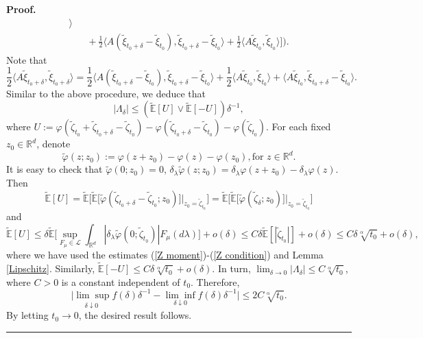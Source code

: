 \documentclass[a4paper,oneside,10pt]{article}%
\newenvironment{proof}[1][Proof]{\noindent \textbf{#1.} }{\  \rule{0.5em}{0.5em}}
\numberwithin{equation}{section}
\begin{document}
\begin{proof}
\begin{align*}
\rangle \\
&  \text{ \  \ }+\frac{1}{2}\langle A(\tilde{\xi}_{t_{0}+\delta}-\tilde{\xi}
_{t_{0}}),\tilde{\xi}_{t_{0}+\delta}-\tilde{\xi}_{t_{0}}\rangle+\frac{1}{2}
\langle A\tilde{\xi}_{t_{0}},\tilde{\xi}_{t_{0}}\rangle \big]\Big).
\end{align*}
Note that
\[
\frac{1}{2}\langle A\tilde{\xi}_{t_{0}+\delta},\tilde{\xi}_{t_{0}+\delta
}\rangle=\frac{1}{2}\langle A(\tilde{\xi}_{t_{0}+\delta}-\tilde{\xi} _{t_{0}%
}),\tilde{\xi}_{t_{0}+\delta}-\tilde{\xi}_{t_{0}}\rangle+\frac{1}{2} \langle
A\tilde{\xi}_{t_{0}},\tilde{\xi}_{t_{0}}\rangle+\langle A\tilde{\xi}_{t_{0}},
\tilde{\xi}_{t_{0}+\delta}-\tilde{\xi}_{t_{0}}\rangle.
\]
Similar to the above procedure, we deduce that
\[
|\Lambda_{\delta}|\leq(\mathbb{\tilde{E}}[U]\vee \mathbb{\tilde{E}}
[-U])\delta^{-1},
\]
where $U:=\varphi(\tilde{\zeta}_{t_{0}}+\tilde{\zeta}_{t_{0}+\delta}-\tilde{
\zeta}_{t_{0}})-\varphi(\tilde{\zeta}_{t_{0}+\delta}-\tilde{\zeta} _{t_{0}%
})-\varphi(\tilde{\zeta}_{t_{0}})$. For each fixed $z_{0}\in \mathbb{R}^{d}$,
denote
\[
\tilde{\varphi}(z;z_{0}):=\varphi(z+z_{0})-\varphi(z)-\varphi(z_{0}),\text{
for }z\in \mathbb{R}^{d}.
\]
It is easy to check that $\tilde{\varphi}(0;z_{0})=0$, $\delta_{\lambda}
\tilde{\varphi}(z;z_{0})=\delta_{\lambda}\varphi(z+z_{0})-\delta_{\lambda
}\varphi(z)$. Then
\[
\mathbb{\tilde{E}}[U]=\mathbb{\tilde{E}}\Big[\mathbb{\tilde{E}} \big[\tilde
{\varphi}( \tilde{\zeta}_{t_{0}+\delta}-\tilde{\zeta} _{t_{0}};z_{0}%
)\big]\big|_{z_{0}=\tilde{\zeta}_{t_{0}}}\Big] =\mathbb{\tilde{E}%
}\Big[\mathbb{\tilde{E}} \big[\tilde{\varphi}( \tilde{\zeta}_{\delta}%
;z_{0})\big]\big|_{z_{0}=\tilde{\zeta}_{t_{0}}}\Big]
\]
and
\[
\mathbb{\tilde{E}}[U]\leq \delta \mathbb{\tilde{E}}\Big[\sup \limits_{F_{\mu}%
\in \mathcal{L}}\int_{\mathbb{R}^{d}}|\delta_{\lambda}\tilde{\varphi}(0;\tilde{
\zeta}_{t_{0}})|F_{\mu}(d\lambda)\Big]+o(\delta)\leq C\delta \mathbb{\tilde{E}}
[|\tilde{\zeta}_{t_{0}}|]+o(\delta)\leq C\delta \sqrt[\alpha]{t_{0}}
+o(\delta),
\]
where we have used the estimates (\ref{Z moment})-(\ref{Z condition}) and
Lemma \ref{Lipschitz}. Similarly, $\mathbb{\tilde{E}}[-U]\leq C\delta
\sqrt[\alpha]{t_{0}}+o(\delta)$. In turn, $\lim_{\delta \rightarrow0}%
|\Lambda_{\delta}|\leq C\sqrt[\alpha]{t_{0}}$, where $C>0$ is a constant
independent of $t_{0}$. Therefore,
\[
\underset{\delta \downarrow0}{|\lim \sup}f(\delta)\delta^{-1}-\underset{
\delta \downarrow0}{\lim \inf}f(\delta)\delta^{-1}|\leq2C\sqrt[\alpha]{t_{0}} .
\]
By letting $t_{0}\rightarrow0$, the desired result follows.
\end{proof}
\end{document}
